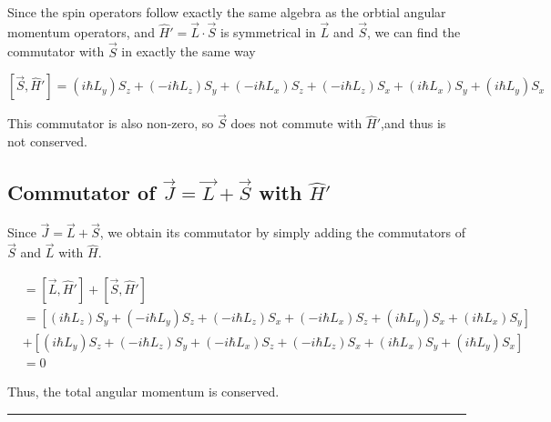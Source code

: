\documentclass{article}
\begin{document}
Since the spin operators follow exactly the same algebra as the orbtial angular momentum operators, and $\hat{H}' = \vec{L}\cdot \vec{S}$ is symmetrical in $\vec{L}$ and $\vec{S}$, we can find the commutator with $\vec{S}$ in exactly the same way

\[ \boxed{ [\vec{S}, \hat{H}'] = (i\hbar L_y)S_z  + (-i\hbar L_z)S_y + (-i\hbar L_x)S_z  + (-i\hbar L_z)S_x +  (i\hbar L_x)S_y  + (i\hbar L_y)S_x  } \]

This commutator is also non-zero, so $\vec{S}$ does not commute with $\hat{H}'$,and thus is not conserved.

\vskip 0.5cm
\subsection*{Commutator of $\vec{J} = \vec{L} + \vec{S}$ with $\hat{H}'$}

Since $\vec{J} = \vec{L} + \vec{S}$, we obtain its commutator by simply adding the commutators of $\vec{S}$ and $\vec{L}$ with $\hat{H}$.

\begin{align*}
  [\vec{J}, \hat{H}'] &= [\vec{L}, \hat{H}'] + [\vec{S}, \hat{H}'] \\
  &= \left[  (i\hbar L_z)S_y  + (-i\hbar L_y)S_z + (-i\hbar L_z)S_x  + (-i\hbar L_x)S_z +  (i\hbar L_y)S_x  + (i\hbar L_x)S_y \right] \\
  &+ \left[ (i\hbar L_y)S_z  + (-i\hbar L_z)S_y + (-i\hbar L_x)S_z  + (-i\hbar L_z)S_x +  (i\hbar L_x)S_y  + (i\hbar L_y)S_x  \right] \\
  &= 0
\end{align*}

Thus, the total angular momentum is conserved.

\vskip 0.5cm 
\hrule 
\vskip 0.5cm
\pagebreak








\end{document}

